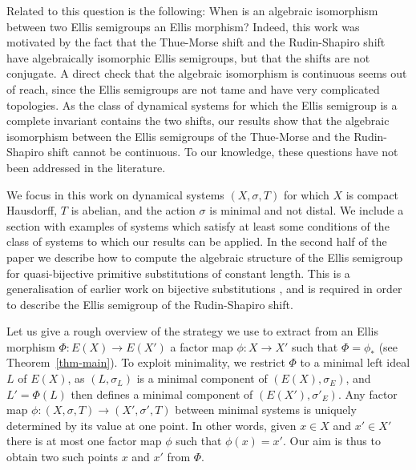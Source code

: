 \documentclass[12pt]{amsart}
\theoremstyle{definition}
\numberwithin{equation}{section}
\begin{document}
Related to this question is the following: {When is an algebraic isomorphism between two Ellis semigroups an Ellis morphism?} Indeed, this work was motivated by the {fact} that the Thue-Morse shift and the 
Rudin-Shapiro shift have algebraically isomorphic Ellis semigroups, but that the shifts are not conjugate. A direct check that the algebraic isomorphism is continuous seems out of reach, since the Ellis semigroups are not tame and have very complicated topologies. As the class of dynamical systems for which the Ellis semigroup is a complete invariant contains the two shifts, our results show that the algebraic isomorphism between the Ellis semigroups of the Thue-Morse and the Rudin-Shapiro shift cannot be continuous. {To our knowledge, these questions have not been addressed in the literature.}

We focus in this work on dynamical systems $(X,\sigma,T)$ for which $X$ is compact Hausdorff, $T$ is abelian, and the action $\sigma$ is minimal and not distal. 
We include a section with examples of systems which satisfy at least some conditions of the class of systems to which our results can be applied.
In the second half of the paper we describe how to compute the algebraic structure of the Ellis semigroup for quasi-bijective primitive substitutions of constant length. This is a generalisation of earlier work on bijective substitutions \cite{ESBS}, and is required in order to describe the Ellis semigroup of the Rudin-Shapiro shift.



Let us give a rough overview of the strategy we use to extract from an 
Ellis morphism $\Phi:E(X)\to E(X')$ a factor map $\phi:X\to X'$ such that $\Phi=\phi_*$ (see Theorem~\ref{thm-main}).  
To exploit minimality, we restrict $\Phi$ to a minimal left ideal $L$ of $E(X)$, as $(L,\sigma_L)$ is a minimal component of $(E(X),\sigma_E)$, and $L'=\Phi(L)$  then defines a minimal component  of $(E(X'), \sigma'_E)$.   
Any factor map $\phi: (X, \sigma,T)\rightarrow (X', \sigma',T)$ between minimal systems is uniquely determined by its value at one point. In other words, given $x\in X$ and $x'\in X'$ there is at most one factor map $\phi$ such that $\phi(x) = x'$. Our aim is thus to obtain two such points $x$ and $x'$ from $\Phi$.
\end{document}
